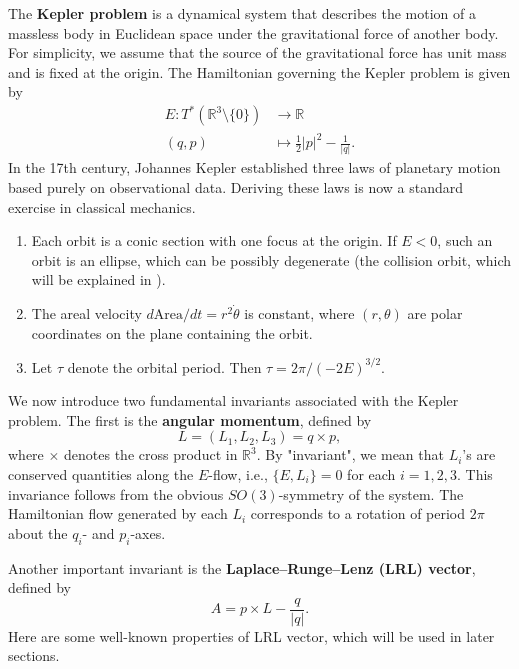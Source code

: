 \documentclass{amsart}
\newcommand{\R}{\mathbb{R}}
\begin{document}
The \textbf{Kepler problem} is a dynamical system that describes the motion of a massless body in Euclidean space under the gravitational force of another body.
For simplicity, we assume that the source of the gravitational force has unit mass and is fixed at the origin.
The Hamiltonian governing the Kepler problem is given by
$$
\begin{aligned}
	E:T^*(\R^3 \setminus\{0\})&\to \R\\
	(q,p)&\mapsto \frac{1}{2}|p|^2 - \frac{1}{|q|}.
\end{aligned}
$$
In the 17th century, Johannes Kepler established three laws of planetary motion based purely on observational data.
Deriving these laws is now a standard exercise in classical mechanics.
\begin{enumerate}
	\item Each orbit is a conic section with one focus at the origin. If $E < 0$, such an orbit is an ellipse, which can be possibly degenerate (the collision orbit, which will be explained in ).
	\item The areal velocity $d\text{Area}/dt = r^2\dot{\theta}$ is constant, where $(r, \theta)$ are polar coordinates on the plane containing the orbit.
	\item Let $\tau$ denote the orbital period. Then $\tau = 2\pi / (-2E)^{3/2}$.
\end{enumerate}
We now introduce two fundamental invariants associated with the Kepler problem.
The first is the \textbf{angular momentum}, defined by
	$$L = (L_1,L_2,L_3) = q \times p,$$
where $\times$ denotes the cross product in $\R^3$.
By "invariant", we mean that $L_i$'s are conserved quantities along the $E$-flow, i.e., $\{E, L_i\} = 0$ for each $i = 1,2,3$.
This invariance follows from the obvious $SO(3)$-symmetry of the system. The Hamiltonian flow generated by each $L_i$ corresponds to a rotation of period $2\pi$ about the $q_i$- and $p_i$-axes.

Another important invariant is the \textbf{Laplace–Runge–Lenz (LRL) vector}, defined by
$$
A = p\times L - \frac{q}{|q|}.
$$
Here are some well-known properties of LRL vector, which will be used in later sections.
\end{document}
